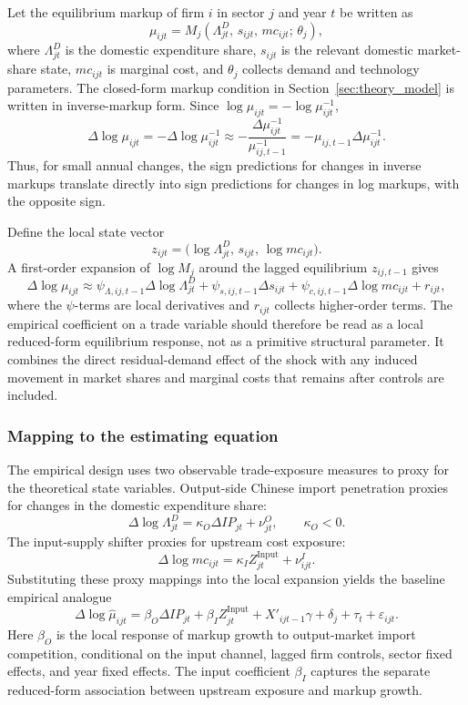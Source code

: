 ﻿\documentclass[12pt]{article}
\begin{document}
Let the equilibrium markup of firm \(i\) in sector \(j\) and year \(t\) be written as
\[
\mu_{ijt}
=
M_j\!\left(\Lambda^D_{jt},\, s_{ijt},\, mc_{ijt};\, \theta_j\right),
\]
where \(\Lambda^D_{jt}\) is the domestic expenditure share, \(s_{ijt}\) is the relevant domestic market-share state, \(mc_{ijt}\) is marginal cost, and \(\theta_j\) collects demand and technology parameters. The closed-form markup condition in Section~\ref{sec:theory_model} is written in inverse-markup form. Since \(\log \mu_{ijt}=-\log \mu^{-1}_{ijt}\),
\[
\Delta \log \mu_{ijt}
=
-\Delta \log \mu^{-1}_{ijt}
\approx
-\frac{\Delta \mu^{-1}_{ijt}}{\mu^{-1}_{ij,t-1}}
=
-\mu_{ij,t-1}\Delta \mu^{-1}_{ijt}.
\]
Thus, for small annual changes, the sign predictions for changes in inverse markups translate directly into sign predictions for changes in log markups, with the opposite sign.

Define the local state vector
\[
z_{ijt}
=
\big(\log \Lambda^D_{jt},\, s_{ijt},\, \log mc_{ijt}\big).
\]
A first-order expansion of \(\log M_j\) around the lagged equilibrium \(z_{ij,t-1}\) gives
\[
\Delta \log \mu_{ijt}
\approx
\psi_{\Lambda,ij,t-1}\Delta \log \Lambda^D_{jt}
+
\psi_{s,ij,t-1}\Delta s_{ijt}
+
\psi_{c,ij,t-1}\Delta \log mc_{ijt}
+
r_{ijt},
\]
where the \(\psi\)-terms are local derivatives and \(r_{ijt}\) collects higher-order terms. The empirical coefficient on a trade variable should therefore be read as a local reduced-form equilibrium response, not as a primitive structural parameter. It combines the direct residual-demand effect of the shock with any induced movement in market shares and marginal costs that remains after controls are included.

\subsubsection*{Mapping to the estimating equation}

The empirical design uses two observable trade-exposure measures to proxy for the theoretical state variables. Output-side Chinese import penetration proxies for changes in the domestic expenditure share:
\[
\Delta \log \Lambda^D_{jt}
=
\kappa_O \Delta IP_{jt}
+
\nu^O_{jt},
\qquad
\kappa_O<0.
\]
The input-supply shifter proxies for upstream cost exposure:
\[
\Delta \log mc_{ijt}
=
\kappa_I Z_{jt}^{\text{Input}}
+
\nu^I_{ijt}.
\]
Substituting these proxy mappings into the local expansion yields the baseline empirical analogue
\[
\Delta \log \hat\mu_{ijt}
=
\beta_O \Delta IP_{jt}
+
\beta_I Z_{jt}^{\text{Input}}
+
X'_{ijt-1}\gamma
+
\delta_j
+
\tau_t
+
\varepsilon_{ijt}.
\]
Here \(\beta_O\) is the local response of markup growth to output-market import competition, conditional on the input channel, lagged firm controls, sector fixed effects, and year fixed effects. The input coefficient \(\beta_I\) captures the separate reduced-form association between upstream exposure and markup growth.
\end{document}
